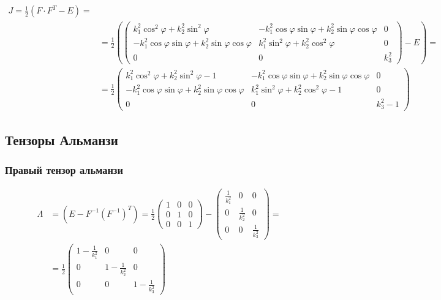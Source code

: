 \documentclass[14pt,a4paper]{scrartcl}
\begin{document}
\begin{equation*}
	\begin{array}{l}
	J=\frac{1}{2}\left(F \cdot F^{T}-E\right)=\\
		&=\frac{1}{2} \left( \left(\begin{array}{ccc}
		k_{1}^{2} \cos ^{2} \varphi+k_{2}^{2} \sin ^{2} \varphi & -k_{1}^{2} \cos \varphi \sin \varphi+k_{2}^{2} \sin \varphi \cos \varphi & 0 \\
		-k_{1}^{2} \cos \varphi \sin \varphi+k_{2}^{2} \sin \varphi \cos \varphi & k_{1}^{2} \sin ^{2} \varphi+k_{2}^{2} \cos ^{2} \varphi & 0 \\
		0 & 0 & k_{3}^{2}
		\end{array}\right) - E\right) = \\
		&= \frac{1}{2}\left(\begin{array}{ccc}
		k_{1}^{2} \cos ^{2} \varphi+k_{2}^{2} \sin ^{2} \varphi-1 & -k_{1}^{2} \cos \varphi \sin \varphi+k_{2}^{2} \sin \varphi \cos \varphi & 0 \\
		-k_{1}^{2} \cos \varphi \sin \varphi+k_{2}^{2} \sin \varphi \cos \varphi & k_{1}^{2} \sin ^{2} \varphi+k_{2}^{2} \cos ^{2} \varphi-1 & 0 \\
		0 & 0 & k_{3}^{2}-1
		\end{array}\right)
	\end{array}
\end{equation*}



\subsection{Тензоры Альманзи}

\subsubsection*{Правый тензор альманзи}

\begin{align*}
	\Lambda&=\left(E-F^{-1}\left(F^{-1}\right)^{T}\right)=\frac{1}{2}\left(\begin{array}{ccc}
	1 & 0 & 0 \\
	0 & 1 & 0 \\
	0 & 0 & 1
	\end{array}\right)-\left(\begin{array}{ccc}
	\frac{1}{k_{1}^{2}} & 0 & 0 \\
	0 & \frac{1}{k_{2}^{2}} & 0 \\
	0 & 0 & \frac{1}{k_{3}^{2}}
	\end{array}\right)=\\
	&= \frac{1}{2}\left(\begin{array}{ccc}
	1-\frac{1}{k_{1}^{2}} & 0 & 0 \\
	0 & 1-\frac{1}{k_{2}^{2}} & 0 \\
	0 & 0 & 1-\frac{1}{k_{3}^{2}}
	\end{array}\right)
\end{align*}
\end{document}
